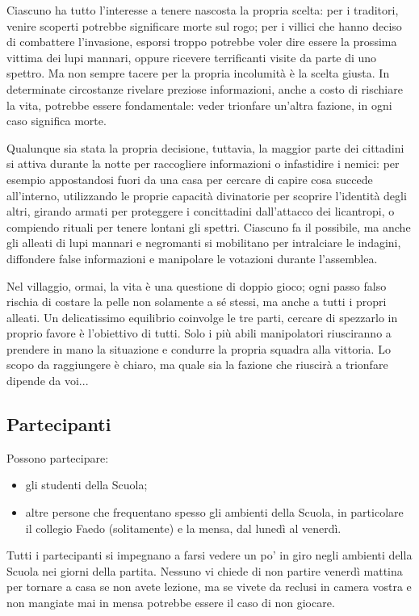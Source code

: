 \documentclass[a4paper,10pt]{article}
\begin{document}
Ciascuno ha tutto l'interesse a tenere nascosta la propria scelta: per i traditori, venire scoperti potrebbe significare morte sul rogo; per i villici che hanno deciso di combattere l'invasione, esporsi troppo potrebbe voler dire essere la prossima vittima dei lupi mannari, oppure ricevere terrificanti visite da parte di uno spettro. Ma non sempre tacere per la propria incolumità è la scelta giusta. In determinate circostanze rivelare preziose informazioni, anche a costo di rischiare la vita, potrebbe essere fondamentale: veder trionfare un'altra fazione, in ogni caso significa morte.

Qualunque sia stata la propria decisione, tuttavia, la maggior parte dei cittadini si attiva durante la notte per raccogliere informazioni o infastidire i nemici: per esempio appostandosi fuori da una casa per cercare di capire cosa succede all'interno, utilizzando le proprie capacità divinatorie per scoprire l'identità degli altri, girando armati per proteggere i concittadini dall'attacco dei licantropi, o compiendo rituali per tenere lontani gli spettri. Ciascuno fa il possibile, ma anche gli alleati di lupi mannari e negromanti si mobilitano per intralciare le indagini, diffondere false informazioni e manipolare le votazioni durante l'assemblea.

Nel villaggio, ormai, la vita è una questione di doppio gioco; ogni passo falso rischia di costare la pelle non solamente a sé stessi, ma anche a tutti i propri alleati. Un delicatissimo equilibrio coinvolge le tre parti, cercare di spezzarlo in proprio favore è l'obiettivo di tutti. Solo i più abili manipolatori riusciranno a prendere in mano la situazione e condurre la propria squadra alla vittoria. Lo scopo da raggiungere è chiaro, ma quale sia la fazione che riuscirà a trionfare dipende da voi...

\subsection{Partecipanti}

Possono partecipare:

\begin{itemize}
	\item gli studenti della Scuola;
	\item altre persone che frequentano spesso gli ambienti della Scuola, in particolare il collegio Faedo (solitamente) e la mensa, dal lunedì al venerdì.
\end{itemize}

Tutti i partecipanti si impegnano a farsi vedere un po' in giro negli ambienti della Scuola nei giorni della partita. Nessuno vi chiede di non partire venerdì mattina per tornare a casa se non avete lezione, ma se vivete da reclusi in camera vostra e non mangiate mai in mensa potrebbe essere il caso di non giocare.
\end{document}

